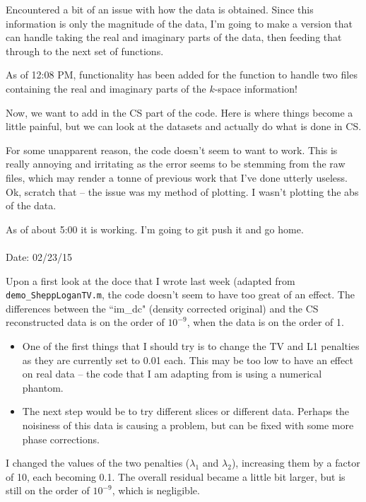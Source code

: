 \documentclass[11 pt]{article}
\begin{document}
    Encountered a bit of an issue with how the data is obtained. Since this information is only the magnitude of the data, I'm going to make a version that can handle taking the real and imaginary parts of the data, then feeding that through to the next set of functions.

    As of 12:08 PM, functionality has been added for the function to handle two files containing the real and imaginary parts of the $k$-space information!

    Now, we want to add in the CS part of the code. Here is where things become a little painful, but we can look at the datasets and actually do what is done in CS.

    For some unapparent reason, the code doesn't seem to want to work. This is really annoying and irritating as the error seems to be stemming from the raw files, which may render a tonne of previous work that I've done utterly useless. Ok, scratch that -- the issue was my method of plotting. I wasn't plotting the abs of the data. 

    As of about 5:00 it is working. I'm going to git push it and go home. \\ \\

\noindent Date: 02/23/15

    Upon a first look at the doce that I wrote last week (adapted from \verb!demo_SheppLoganTV.m!, the code doesn't seem to have too great of an effect. The differences between the ``im\_dc" (density corrected original) and the CS reconstructed data is on the order of $10^{-9}$, when the data is on the order of 1.

    \begin{itemize}
      \item One of the first things that I should try is to change the TV and L1 penalties as they are currently set to 0.01 each. This may be too low to have an effect on real data -- the code that I am adapting from is using a numerical phantom.
      \item The next step would be to try different slices or different data. Perhaps the noisiness of this data is causing a problem, but can be fixed with some more phase corrections.
    \end{itemize}

    I changed the values of the two penalties ($\lambda_1$ and $\lambda_2$), increasing them by a factor of 10, each becoming 0.1. The overall residual became a little bit larger, but is still on the order of $10^{-9}$, which is negligible.
\end{document}
